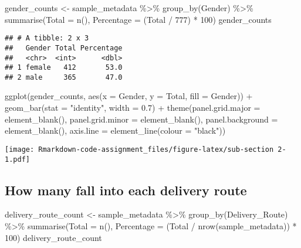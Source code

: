 \documentclass[
]{article}
\newenvironment{Shaded}{\begin{snugshade}}{\end{snugshade}}
\newcommand{\AttributeTok}[1]{\textcolor[rgb]{0.77,0.63,0.00}{#1}}
\newcommand{\DecValTok}[1]{\textcolor[rgb]{0.00,0.00,0.81}{#1}}
\newcommand{\FloatTok}[1]{\textcolor[rgb]{0.00,0.00,0.81}{#1}}
\newcommand{\FunctionTok}[1]{\textcolor[rgb]{0.00,0.00,0.00}{#1}}
\newcommand{\NormalTok}[1]{#1}
\newcommand{\OtherTok}[1]{\textcolor[rgb]{0.56,0.35,0.01}{#1}}
\newcommand{\SpecialCharTok}[1]{\textcolor[rgb]{0.00,0.00,0.00}{#1}}
\newcommand{\StringTok}[1]{\textcolor[rgb]{0.31,0.60,0.02}{#1}}
\begin{document}
\begin{Shaded}
\begin{Highlighting}[]
\NormalTok{gender\_counts }\OtherTok{\textless{}{-}}\NormalTok{ sample\_metadata }\SpecialCharTok{\%\textgreater{}\%} 
  \FunctionTok{group\_by}\NormalTok{(Gender) }\SpecialCharTok{\%\textgreater{}\%} 
  \FunctionTok{summarise}\NormalTok{(}\AttributeTok{Total =} \FunctionTok{n}\NormalTok{(), }\AttributeTok{Percentage =}\NormalTok{ (Total }\SpecialCharTok{/} \DecValTok{777}\NormalTok{) }\SpecialCharTok{*} \DecValTok{100}\NormalTok{)}
\NormalTok{gender\_counts}
\end{Highlighting}
\end{Shaded}

\begin{verbatim}
## # A tibble: 2 x 3
##   Gender Total Percentage
##   <chr>  <int>      <dbl>
## 1 female   412       53.0
## 2 male     365       47.0
\end{verbatim}

\begin{Shaded}
\begin{Highlighting}[]
\FunctionTok{ggplot}\NormalTok{(gender\_counts, }\FunctionTok{aes}\NormalTok{(}\AttributeTok{x =}\NormalTok{ Gender, }\AttributeTok{y =}\NormalTok{ Total, }\AttributeTok{fill =}\NormalTok{ Gender)) }\SpecialCharTok{+} 
  \FunctionTok{geom\_bar}\NormalTok{(}\AttributeTok{stat =} \StringTok{"identity"}\NormalTok{, }\AttributeTok{width =} \FloatTok{0.7}\NormalTok{) }\SpecialCharTok{+} 
  \FunctionTok{theme}\NormalTok{(}\AttributeTok{panel.grid.major =} \FunctionTok{element\_blank}\NormalTok{(), }\AttributeTok{panel.grid.minor =} \FunctionTok{element\_blank}\NormalTok{(),}
        \AttributeTok{panel.background =} \FunctionTok{element\_blank}\NormalTok{(), }\AttributeTok{axis.line =} \FunctionTok{element\_line}\NormalTok{(}\AttributeTok{colour =} \StringTok{"black"}\NormalTok{))}
\end{Highlighting}
\end{Shaded}

\texttt{[image: Rmarkdown-code-assignment\_files/figure-latex/sub-section 2-1.pdf]}

\hypertarget{how-many-fall-into-each-delivery-route}{%
\subsection{How many fall into each delivery
route}\label{how-many-fall-into-each-delivery-route}}

\begin{Shaded}
\begin{Highlighting}[]
\NormalTok{delivery\_route\_count }\OtherTok{\textless{}{-}}\NormalTok{ sample\_metadata }\SpecialCharTok{\%\textgreater{}\%} 
  \FunctionTok{group\_by}\NormalTok{(Delivery\_Route) }\SpecialCharTok{\%\textgreater{}\%} 
  \FunctionTok{summarise}\NormalTok{(}\AttributeTok{Total =} \FunctionTok{n}\NormalTok{(), }\AttributeTok{Percentage =}\NormalTok{ (Total }\SpecialCharTok{/} \FunctionTok{nrow}\NormalTok{(sample\_metadata)) }\SpecialCharTok{*} \DecValTok{100}\NormalTok{)}
\NormalTok{delivery\_route\_count}
\end{Highlighting}
\end{Shaded}
\end{document}
